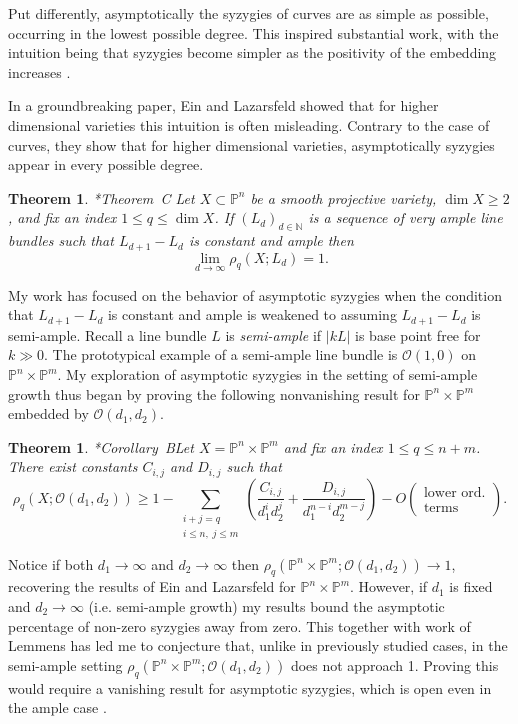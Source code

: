 \documentclass[11pt,reqno]{amsart}
\newtheorem{theorem}[lemma]{Theorem}
\theoremstyle{remark}
\renewcommand{\O}{\mathcal{O}}
\newcommand{\N}{\mathbb{N}}
\renewcommand{\P}{\mathbb{P}}
\begin{document}
Put differently, asymptotically the syzygies of curves are as simple as possible, occurring in the lowest possible degree. This inspired substantial work, with the intuition being that syzygies become simpler as the positivity of the embedding increases \cite{ottavianiPaoletti01, einLazarsfeld93, lazarsfeldPareschiPopa11, pareschi00, pareschiPopa03, pareschiPopa04}.  

In a groundbreaking paper, Ein and Lazarsfeld showed that for higher dimensional varieties this intuition is often misleading. Contrary to the case of curves, they show that for higher dimensional varieties, asymptotically syzygies appear in every possible degree. 
  
\begin{theorem}\cite{einLazarsfeld12}*{Theorem~C}
Let $X\subset \P^n$ be a smooth projective variety, $\dim X \geq2$, and fix an index $1\leq q \leq \dim X$. If $(L_{d})_{d\in\N}$ is a sequence of very ample line bundles such that $L_{d+1}-L_{d}$ is constant and ample then
\[
\lim_{d\to\infty} \rho_{q}\left(X; L_d\right) = 1.
\]
\end{theorem}

My work has focused on the behavior of asymptotic syzygies when the condition that $L_{d+1}-L_{d}$ is constant and ample is weakened to assuming $L_{d+1}-L_{d}$ is semi-ample. Recall a line bundle $L$ is \textit{semi-ample} if $|kL|$ is base point free for $k\gg0$. The prototypical example of a semi-ample line bundle is $\O(1,0)$ on $\P^{n}\times \P^{m}$. My exploration of asymptotic syzygies in the setting of semi-ample growth thus began by proving the following nonvanishing result for $\P^{n}\times\P^{m}$ embedded by $\O(d_{1},d_{2})$. 

\begin{theorem}\cite{bruce19-semiample}*{Corollary~B}\label{thm:bruce-semiample}
Let $X=\P^{n}\times\P^{m}$ and fix an index $1\leq q \leq n+m$. There exist constants $C_{i,j}$ and $D_{i,j}$ such that
\[
\rho_{q}\left(X; \O\left(d_1,d_2\right)\right)\geq1-\sum_{\substack{i+j=q \\  i \leq n, \; j \leq m}}\left(
\frac{C_{i,j}}{d_1^id_2^j}+\frac{D_{i,j}}{d_1^{n-i}d_2^{m-j}}\right)-O\left(\begin{matrix}\text{lower ord.}\\ \text{terms}\end{matrix}\right).
\]
\end{theorem}

Notice if both $d_{1}\to \infty$ and $d_{2}\to\infty$ then $\rho_{q}\left(\P^{n}\times\P^{m}; \O(d_1,d_2)\right)\to1$, recovering the results of Ein and Lazarsfeld for $\P^n\times\P^m$. However, if $d_{1}$ is fixed and $d_{2}\to \infty$ (i.e. semi-ample growth) my results bound the asymptotic percentage of non-zero syzygies away from zero. This together with work of Lemmens \cite{lemmens18} has led me to conjecture that, unlike in previously studied cases, in the semi-ample setting $\rho_{q}\left(\P^{n}\times\P^{m}; \O(d_1,d_2)\right)$ does not approach 1. Proving this would require a vanishing result for asymptotic syzygies, which is open even in the ample case  \cite[Conjectures~7.1,~7.5]{einLazarsfeld12}.
\end{document}
